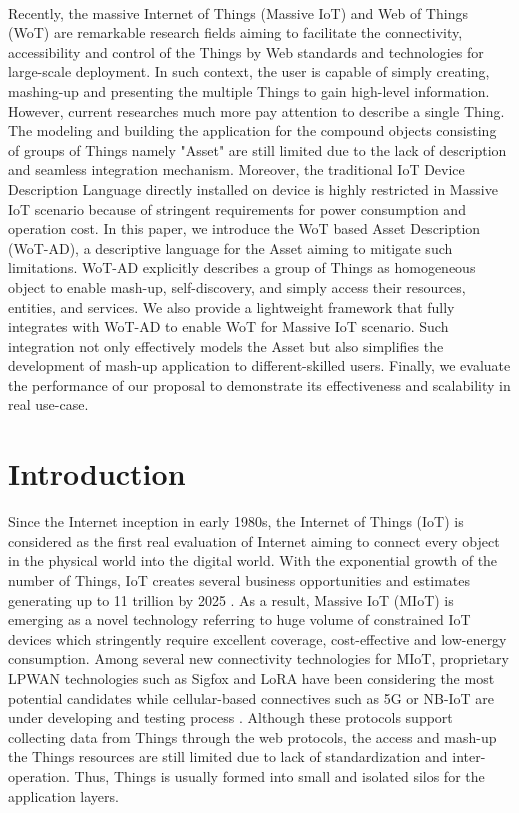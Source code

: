 \paragraph{}
Recently, the massive Internet of Things (Massive IoT) and Web of Things (WoT) are remarkable research fields aiming to facilitate the connectivity, accessibility and control of the Things by Web standards and technologies for large-scale deployment. In such context, the user is capable of simply creating, mashing-up and presenting the multiple Things to gain high-level information. However, current researches much more pay attention to describe a single Thing. The modeling and building the application for the compound objects consisting of groups of Things namely "Asset" are still limited due to the lack of description and seamless integration mechanism. 
Moreover, the traditional IoT Device Description Language directly installed on device is highly restricted in Massive IoT scenario because of stringent requirements for power consumption and operation cost.   
In this paper, we introduce the WoT based Asset Description (WoT-AD), a descriptive language for the Asset aiming to mitigate such limitations. WoT-AD explicitly describes a group of Things as homogeneous object to enable mash-up, self-discovery, and simply access their resources, entities, and services. We also provide a lightweight framework that fully integrates with WoT-AD to enable WoT for Massive IoT scenario. Such integration not only effectively models the Asset but also simplifies the development of mash-up application to different-skilled users. Finally, we evaluate the performance of our proposal to demonstrate its effectiveness and scalability in real use-case.
\section{Introduction}
Since the Internet inception in early 1980s, the Internet of Things (IoT) is considered as the first real evaluation of Internet \cite{lee2015internet} aiming to connect every object in the physical world into the digital world. With the exponential growth of the number of Things, IoT creates several business opportunities and estimates generating up to 11 trillion by 2025 \cite{manyika2015unlocking}. As a result, Massive IoT (MIoT)	is emerging	as a novel technology referring to huge volume of constrained IoT devices which stringently require excellent coverage, cost-effective and low-energy consumption. Among several new connectivity technologies for MIoT, proprietary LPWAN technologies such as Sigfox and LoRA have been considering the most potential candidates while cellular-based connectives such as 5G or NB-IoT are under developing and testing process \cite{raza2017low}. Although these protocols support collecting data from Things through the web protocols, the access and mash-up the Things resources are still limited due to lack of standardization and inter-operation. Thus, Things is usually formed into small and isolated silos for the application layers. \\

